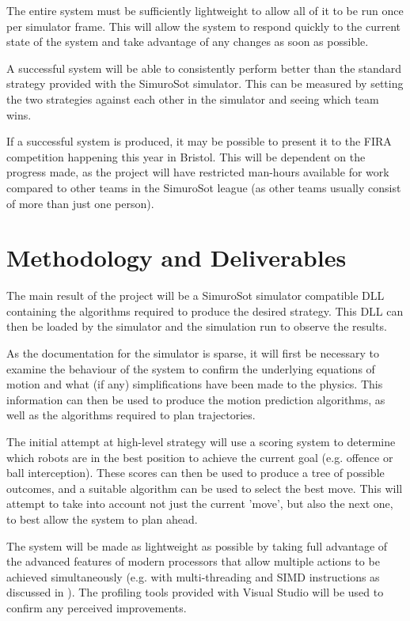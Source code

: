 \documentclass[a4paper,10pt]{article}
\begin{document}
The entire system must be sufficiently lightweight to allow all of it to be run once per simulator frame.  This will allow the system to respond quickly to the current state of the system and take advantage of any changes as soon as possible.

A successful system will be able to consistently perform better than the standard strategy provided with the SimuroSot simulator.  This can be measured by setting the two strategies against each other in the simulator and seeing which team wins.

If a successful system is produced, it may be possible to present it to the \ac{FIRA} competition happening this year in Bristol.  This will be dependent on the progress made, as the project will have restricted man-hours available for work compared to other teams in the SimuroSot league (as other teams usually consist of more than just one person).

\section{Methodology and Deliverables}
The main result of the project will be a SimuroSot simulator compatible \ac{DLL} containing the algorithms required to produce the desired strategy.  This \ac{DLL} can then be loaded by the simulator and the simulation run to observe the results.

As the documentation for the simulator is sparse, it will first be necessary to examine the behaviour of the system to confirm the underlying equations of motion and what (if any) simplifications have been made to the physics.  This information can then be used to produce the motion prediction algorithms, as well as the algorithms required to plan trajectories.

The initial attempt at high-level strategy will use a scoring system to determine which robots are in the best position to achieve the current goal (e.g. offence or ball interception).  These scores can then be used to produce a tree of possible outcomes, and a suitable algorithm can be used to select the best move.  This will attempt to take into account not just the current 'move', but also the next one, to best allow the system to plan ahead.

The system will be made as lightweight as possible by taking full advantage of the advanced features of modern processors that allow multiple actions to be achieved simultaneously (e.g. with multi-threading and \ac{SIMD} instructions as discussed in \cite{intelMatrixInverse}).  The profiling tools provided with Visual Studio will be used to confirm any perceived improvements.
\end{document}
